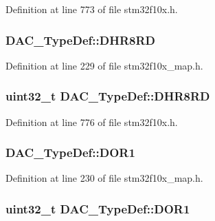 Definition at line 773 of file stm32f10x.\+h.

\subsubsection[{\texorpdfstring{D\+H\+R8\+RD}{DHR8RD}}]{ D\+A\+C\+\_\+\+Type\+Def\+::\+D\+H\+R8\+RD}\hypertarget{struct_d_a_c___type_def_a0a36ae3e8810a7e2e9e0ad7537142601}{}\label{struct_d_a_c___type_def_a0a36ae3e8810a7e2e9e0ad7537142601}


Definition at line 229 of file stm32f10x\+\_\+map.\+h.

\subsubsection[{\texorpdfstring{D\+H\+R8\+RD}{DHR8RD}}]{ {\bf uint32\+\_\+t} D\+A\+C\+\_\+\+Type\+Def\+::\+D\+H\+R8\+RD}\hypertarget{struct_d_a_c___type_def_a03f8d95bbf0ce3a53cb79506d5bf995a}{}\label{struct_d_a_c___type_def_a03f8d95bbf0ce3a53cb79506d5bf995a}


Definition at line 776 of file stm32f10x.\+h.

\subsubsection[{\texorpdfstring{D\+O\+R1}{DOR1}}]{ D\+A\+C\+\_\+\+Type\+Def\+::\+D\+O\+R1}\hypertarget{struct_d_a_c___type_def_a7099a90755cedcb3341ceb3a62236209}{}\label{struct_d_a_c___type_def_a7099a90755cedcb3341ceb3a62236209}


Definition at line 230 of file stm32f10x\+\_\+map.\+h.

\subsubsection[{\texorpdfstring{D\+O\+R1}{DOR1}}]{ {\bf uint32\+\_\+t} D\+A\+C\+\_\+\+Type\+Def\+::\+D\+O\+R1}\hypertarget{struct_d_a_c___type_def_a50b4f0b0d2a376f729c8d7acf47864c3}{}\label{struct_d_a_c___type_def_a50b4f0b0d2a376f729c8d7acf47864c3}



